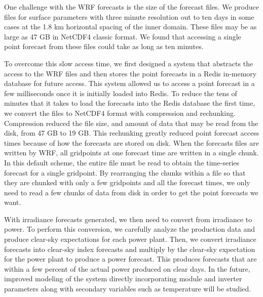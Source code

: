 One challenge with the WRF forecasts is the size of the forecast
files.
We produce files for surface parameters with three minute resolution
out to ten days in some cases at the 1.8 km horizontal spacing of the
inner domain.
These files may be as large as 47 GB in NetCDF4 classic format.
We found that accessing a single point forecast from these files could
take as long as ten minutes.

To overcome this slow access time, we first designed a system that
abstracts the access to the WRF files and then stores the point
forecasts in a Redis in-memory database for future access.
This system allowed us to access a point forecast in a few
milliseconds once it is initially loaded into Redis.
To reduce the tens of minutes that it takes to load the forecasts into
the Redis database the first time, we convert the files to NetCDF4
format with compression and rechunking.
Compression reduced the file size, and amount of data that may be read
from the disk, from 47 GB to 19 GB.
This rechunking greatly reduced point forecast access times because of
how the forecasts are stored on disk.
When the forecasts files are written by WRF, all gridpoints at one
forecast time are written in a single chunk.
In this default scheme, the entire file must be read to obtain the
time-series forecast for a single gridpoint.
By rearranging the chunks within a file so that they are chunked with
only a few gridpoints and all the forecast times, we
only need to read a few chunks of data from disk in order to get the
point forecasts we want.

With irradiance forecasts generated, we then need to convert from
irradiance to power.
To perform this conversion, we carefully analyze the
production data and produce clear-sky expectations for each power
plant.
Then, we convert irradiance forecasts into clear-sky index forecasts
and multiply by the clear-sky expectation for the power plant to
produce a power forecast.
This produces forecasts that are within a few percent of the actual
power produced on clear days.
In the future, improved modeling of the system directly incorporating
module and inverter parameters along with secondary variables such as
temperature will be studied.

